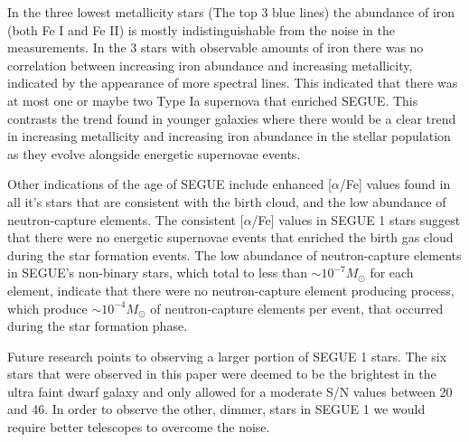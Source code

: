 \documentclass{aastex631}
\begin{document}
In the three lowest metallicity stars (The top 3 blue lines) the abundance of iron (both Fe I and Fe II) is mostly indistinguishable
from the noise in the measurements. In the 3 stars with observable amounts of iron there was no correlation between increasing
iron abundance and increasing metallicity, indicated by the appearance of more spectral lines. This indicated that there was at most
one or maybe two Type Ia supernova that enriched SEGUE. This
contrasts the trend found in younger galaxies where there would be a clear trend in increasing metallicity and increasing
iron abundance in the stellar population as they evolve alongside energetic supernovae events.

Other indications of the age of SEGUE include enhanced [$\alpha$/Fe] values found in all it's stars that are consistent with the birth 
cloud, and the low abundance of neutron-capture
elements. The consistent [$\alpha$/Fe] values in SEGUE 1 stars suggest that there were no energetic supernovae events that enriched
the birth gas cloud during the star formation events. The low abundance of neutron-capture elements in SEGUE's non-binary stars,
which total to less than \(\sim 10^{-7} M_{\odot}\) for each element, indicate that there were no neutron-capture element producing
process, which produce \(\sim 10^{-4} M_{\odot}\) of neutron-capture elements per event, that occurred during the star formation phase.

Future research points to observing a larger portion of SEGUE 1 stars. The six stars that were observed in this paper were deemed to
be the brightest in the ultra faint dwarf galaxy and only allowed for a moderate S/N values between 20 and 46. In order to observe the other, dimmer,
stars in SEGUE 1 we would require better telescopes to overcome the noise.


\nocite{*}
{}



\end{document}
